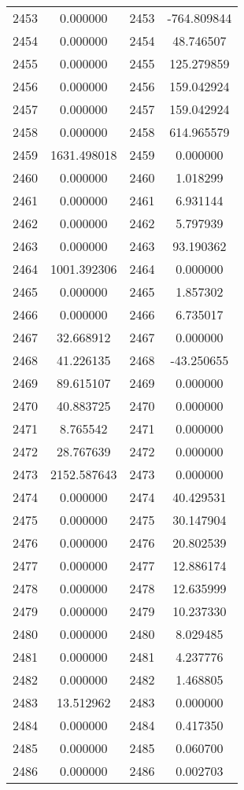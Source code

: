 \documentclass[12pt]{article}
\begin{document}
\begin{longtable}{@{}cccc@{}}
2453 & 0.000000 & 2453 & -764.809844 \\
2454 & 0.000000 & 2454 & 48.746507 \\
2455 & 0.000000 & 2455 & 125.279859 \\
2456 & 0.000000 & 2456 & 159.042924 \\
2457 & 0.000000 & 2457 & 159.042924 \\
2458 & 0.000000 & 2458 & 614.965579 \\
2459 & 1631.498018 & 2459 & 0.000000 \\
2460 & 0.000000 & 2460 & 1.018299 \\
2461 & 0.000000 & 2461 & 6.931144 \\
2462 & 0.000000 & 2462 & 5.797939 \\
2463 & 0.000000 & 2463 & 93.190362 \\
2464 & 1001.392306 & 2464 & 0.000000 \\
2465 & 0.000000 & 2465 & 1.857302 \\
2466 & 0.000000 & 2466 & 6.735017 \\
2467 & 32.668912 & 2467 & 0.000000 \\
2468 & 41.226135 & 2468 & -43.250655 \\
2469 & 89.615107 & 2469 & 0.000000 \\
2470 & 40.883725 & 2470 & 0.000000 \\
2471 & 8.765542 & 2471 & 0.000000 \\
2472 & 28.767639 & 2472 & 0.000000 \\
2473 & 2152.587643 & 2473 & 0.000000 \\
2474 & 0.000000 & 2474 & 40.429531 \\
2475 & 0.000000 & 2475 & 30.147904 \\
2476 & 0.000000 & 2476 & 20.802539 \\
2477 & 0.000000 & 2477 & 12.886174 \\
2478 & 0.000000 & 2478 & 12.635999 \\
2479 & 0.000000 & 2479 & 10.237330 \\
2480 & 0.000000 & 2480 & 8.029485 \\
2481 & 0.000000 & 2481 & 4.237776 \\
2482 & 0.000000 & 2482 & 1.468805 \\
2483 & 13.512962 & 2483 & 0.000000 \\
2484 & 0.000000 & 2484 & 0.417350 \\
2485 & 0.000000 & 2485 & 0.060700 \\
2486 & 0.000000 & 2486 & 0.002703 \\

\end{longtable}
\end{document}
